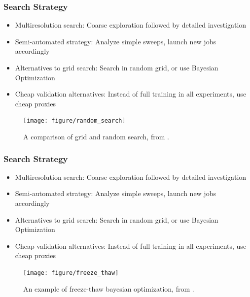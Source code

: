 \documentclass[10pt,mathserif]{beamer}
\begin{document}
\begin{frame}
  \frametitle{Search Strategy}
  \begin{itemize}
  \item Multiresolution search: Coarse exploration followed by detailed
    investigation
  \item Semi-automated strategy: Analyze simple sweeps, launch new jobs
    accordingly
  \item Alternatives to grid search: Search in random grid, or use Bayesian
    Optimization
  \item Cheap validation alternatives: Instead of full training in all
    experiments, use cheap proxies
  \end{itemize}
  \begin{figure}[ht]
    \centering
    \texttt{[image: figure/random\_search]}
    \caption{A comparison of grid and random search, from
      \citep{bergstra2012random}. \label{fig:random_search} }
  \end{figure}
\end{frame}

\begin{frame}
  \frametitle{Search Strategy}
  \begin{itemize}
  \item Multiresolution search: Coarse exploration followed by detailed
    investigation
  \item Semi-automated strategy: Analyze simple sweeps, launch new jobs
    accordingly
  \item Alternatives to grid search: Search in random grid, or use Bayesian
    Optimization
  \item Cheap validation alternatives: Instead of full training in all
    experiments, use cheap proxies
  \end{itemize}
  \begin{figure}[ht]
    \centering
    \texttt{[image: figure/freeze\_thaw]}
    \caption{An example of freeze-thaw bayesian optimization, from
      \citep{swersky2014freeze}. \label{fig:random_search} }
  \end{figure}
\end{frame}
\end{document}
